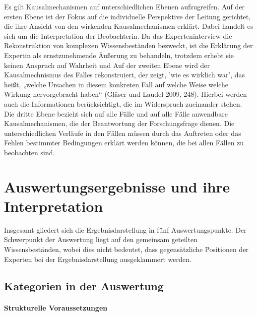 Es gilt Kausalmechanismen auf unterschiedlichen Ebenen aufzugreifen.
Auf der ersten Ebene ist der Fokus auf die individuelle Perspektive der Leitung gerichtet, die ihre Ansicht von den wirkenden Kausalmechanismen erklärt. Dabei handelt es sich um die Interpretation der Beobachterin. Da das Experteninterview die Rekonstruktion von komplexen Wissensbeständen bezweckt, ist die Erklärung der Expertin als  ernstzunehmende Äußerung zu behandeln, trotzdem erhebt sie keinen Anspruch auf Wahrheit und 
Auf der zweiten Ebene wird der Kausalmechnismus des Falles rekonstruiert, der zeigt, 'wie es wirklich war', das heißt, „welche Ursachen in diesem konkreten Fall auf welche Weise welche Wirkung hervorgebracht haben“ (Gläser und Laudel 2009, 248). Hierbei werden auch die Informationen berücksichtigt, die im Widerspruch zueinander stehen.
Die dritte Ebene bezieht sich auf alle Fälle und auf alle Fälle anwendbare Kausalmechanismen, die der Beantwortung der Forschungsfrage dienen. Die unterschiedlichen Verläufe in den Fällen müssen durch das Auftreten oder das Fehlen bestimmter Bedingungen erklärt werden können, die bei allen Fällen zu beobachten sind. 

\section{Auswertungsergebnisse und ihre Interpretation}

Insgesamt gliedert sich die Ergebnisdarstellung in fünf Auswertungspunkte. 
Der Schwerpunkt der Auswertung liegt auf den gemeinsam geteilten Wissensbeständen, wobei dies nicht
bedeutet, dass gegensätzliche Positionen der Experten bei der Ergebnisdarstellung ausgeklammert werden.
 
\subsection{Kategorien in der Auswertung}
\paragraph{Strukturelle Voraussetzungen}

